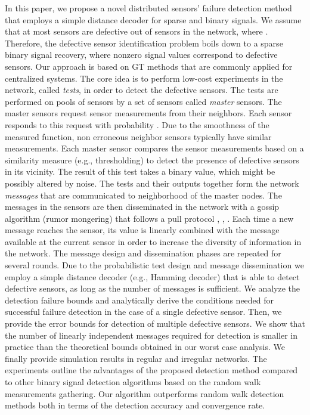 \documentclass[journal]{IEEEtran}
\begin{document}
In this paper, we propose a novel distributed sensors' failure detection method that employs a simple distance decoder for sparse and binary signals. We assume that at most  sensors are defective out of  sensors in the network, where . Therefore, the defective sensor identification problem boils down to a sparse binary signal recovery, where nonzero signal values correspond to defective sensors. Our approach is based on GT methods that are commonly applied for centralized systems. The core idea is to perform low-cost experiments in the network, called \textit{tests}, in order to detect the defective sensors. The tests are performed on pools of sensors by a set of sensors called \textit{master} sensors. The master sensors request sensor measurements from their neighbors. Each sensor responds to this request with probability . Due to the smoothness of the measured function, non erroneous neighbor sensors typically have similar measurements. Each master sensor compares the sensor measurements based on a similarity measure (e.g., thresholding) to detect the presence of defective sensors in its vicinity. The result of this test takes a binary value, which might be possibly altered by noise. The tests and their outputs together form the network \textit{messages} that are communicated to neighborhood of the master nodes. The messages in the sensors are then disseminated in the network with a gossip algorithm (rumor mongering) \cite{Dimakis:10} that follows a pull protocol \cite{Demers:87}, \cite{Karp00}, \cite{Deb:2006}. Each time a new message reaches the sensor, its value is linearly combined with the message available at the current sensor in order to increase the diversity of information in the network. The message design and dissemination phases are repeated for several rounds. Due to the probabilistic test design and message dissemination we employ a simple distance decoder (e.g., Hamming decoder) that is able to detect defective sensors, as long as the number of messages is sufficient. We analyze the detection failure bounds and analytically derive the conditions needed for successful failure detection in the case of a single defective sensor. Then, we provide the error bounds for detection of multiple defective sensors. We show that the number of linearly independent messages required for detection is smaller in practice than the theoretical bounds obtained in our worst case analysis. We finally provide simulation results in regular and irregular networks. The experiments outline the advantages of the proposed detection method compared to other binary signal detection algorithms based on the random walk measurements gathering. Our algorithm outperforms random walk detection methods both in terms of the detection accuracy and convergence rate. 
\end{document}
